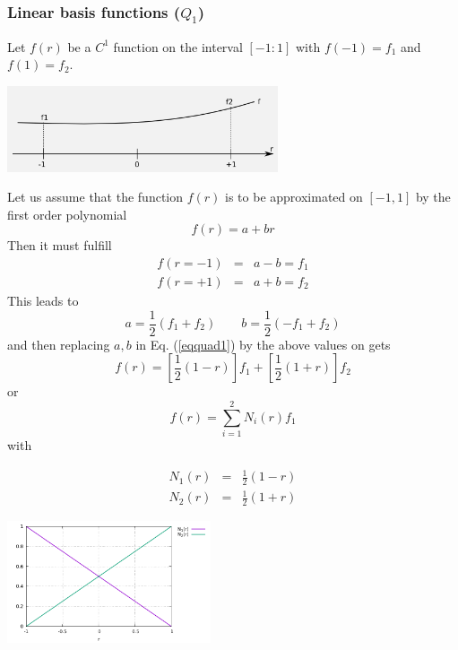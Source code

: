 
\subsubsection{Linear basis functions ($Q_1$)}

Let $f(r)$ be a $C^1$ function on the interval $[-1:1]$ with $f(-1)=f_1$  and $f(1)=f_2$.
\begin{center}
\includegraphics[width=8cm]{images/linshapefct.png}
\end{center}
Let us assume that the function $f(r)$ is to be approximated on $[-1,1]$ by the first order polynomial 
\begin{equation}
f(r)=a+br \label{eqquad1}
\end{equation}
Then it must fulfill
\begin{eqnarray}
f(r=-1)&=&a-b =f_1 \nonumber\\
f(r=+1)&=&a+b =f_2 \nonumber
\end{eqnarray}
This leads to  
\[
a=\frac{1}{2}(f_1+f_2)  
\quad\quad
b=\frac{1}{2}(-f_1+f_2)  
\]
and then replacing $a,b$ in Eq. (\ref{eqquad1}) by the above values on gets
\[
f(r) = \left[  \frac{1}{2}(1-r)\right] f_1 + \left[ \frac{1}{2}(1+r) \right] f_2
\]
or
\[
f(r)=\sum_{i=1}^2 N_i(r) f_1
\]
with
\begin{mdframed}[backgroundcolor=blue!5]
\begin{eqnarray}
N_1(r) &=& \frac{1}{2} (1-r) \nonumber\\
N_2(r) &=& \frac{1}{2} (1+r)
\end{eqnarray}
\end{mdframed}

\begin{center}
\includegraphics[width=6cm]{images/basis1D/linear.pdf}
\end{center}

